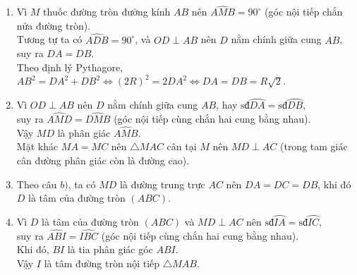 \begin{bt}
{\begin{enumerate}
\item Vì $M$ thuốc đường tròn đường kính $AB$ nên $\widehat{AMB}= 90^\circ$ (góc nội tiếp chắn nửa đường tròn).\\
Tương tự ta có $\widehat{ADB}= 90^\circ$, và $OD\perp AB$ nên $D$ nằm chính giữa cung $AB$, suy ra $DA=DB$.\\
Theo định lý Pythagore, $AB^2=DA^2+DB^2\Leftrightarrow (2R)^2=2DA^2\Leftrightarrow DA=DB=R\sqrt{2}$.
\item Vì $OD\perp AB$ nên $D$ nằm chính giữa cung $AB$, hay $\text{sđ}\wideparen{DA}=\text{sđ}\wideparen{DB}$,\\
 suy ra $\widehat{AMD}=\widehat{DMB}$ (góc nội tiếp cùng chắn hai cung bằng nhau).\\
Vậy $MD$ là phân giác $\widehat{AMB}$.\\
Mặt khác $MA=MC$ nên $\triangle MAC$ cân tại $M$ nên $MD\perp AC$ (trong tam giác cân đường phân giác còn là đường cao).
\item Theo câu $b)$, ta có $MD$ là đường trung trực $AC$ nên $DA=DC=DB$, khi đó $D$ là tâm của đường tròn $(ABC)$.
\item Vì $D$ là tâm của đường tròn $(ABC)$ và $MD\perp AC$ nên $\text{sđ}\wideparen{IA}=\text{sđ}\wideparen{IC}$,\\ 
suy ra $\widehat{ABI}=\widehat{IBC}$ (góc nội tiếp cùng chắn hai cung bằng nhau).\\
Khi đó, $BI$ là tia phân giác góc $ABI$.\\
Vậy $I$ là tâm đường tròn nội tiếp $\triangle MAB$. 
\end{enumerate}
}
\end{bt}

